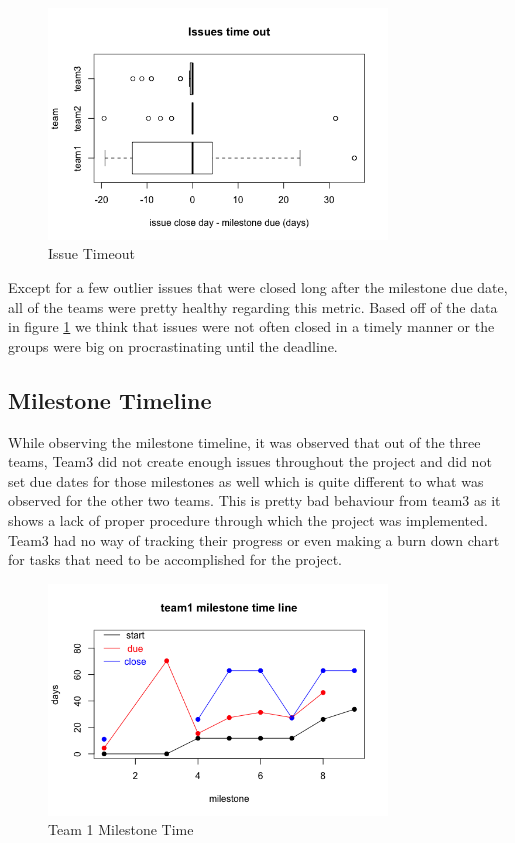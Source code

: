 \documentclass[conference]{IEEEtran}
\begin{document}
\begin{figure}[H]
    \centering
    \includegraphics[width=9cm]{../AprilProject/pic/issues_timeout.png}
    \caption{Issue Timeout}
    \label{issue_timeout}
\end{figure}


Except for a few outlier issues that were closed long after the milestone due date, all of the teams were pretty healthy regarding this metric. Based off of the data in figure \ref{issue_timeout} we think that issues were not often closed in a timely manner or the groups were big on procrastinating until the deadline. 


\subsection{Milestone Timeline}

While observing the milestone timeline, it was observed that out of the three teams, Team3 did not create enough issues throughout the project and did not set due dates for those milestones as well which is quite different to what was observed for the other two teams. This is pretty bad behaviour from team3 as it shows a lack of proper procedure through which the project was implemented. Team3 had no way of tracking their progress or even making a burn down chart for tasks that need to be accomplished for the project. 

\begin{figure}[H]
    \centering
    \includegraphics[width=9cm]{../AprilProject/pic/team1_milestone_time.png}
    \caption{Team 1 Milestone Time}
    \label{team1_milestone_time}
\end{figure}
\end{document}
